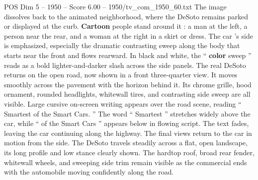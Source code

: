 \begin{textsample}{POS Dim 5 – 1950 – Score 6.00 – 1950/tv\_com\_1950\_60.txt}
The image dissolves back to the animated neighborhood, where the DeSoto remains parked or displayed at the curb. \textbf{Cartoon} people stand around it : a man at the left, a person near the rear, and a woman at the right in a skirt or dress.
The car ’s side is emphasized, especially the dramatic contrasting sweep along the body that starts near the front and flows rearward.
In black and white, the “ \textbf{color} sweep ” reads as a bold lighter-and-darker slash across the side panels.
The real DeSoto returns on the open road, now shown in a front three-quarter view.
It moves smoothly across the pavement with the horizon behind it.
Its chrome grille, hood ornament, rounded headlights, whitewall tires, and contrasting side sweep are all visible.
Large cursive on-screen writing appears over the road scene, reading “ Smartest of the Smart Cars. ” The word “ Smartest ” stretches widely above the car, while “ of the Smart Cars ” appears below in flowing script.
The text fades, leaving the car continuing along the highway.
The final views return to the car in motion from the side.
The DeSoto travels steadily across a flat, open landscape, its long profile and low stance clearly shown.
The hardtop roof, broad rear fender, whitewall wheels, and sweeping side trim remain visible as the commercial ends with the automobile moving confidently along the road.

\end{textsample}
